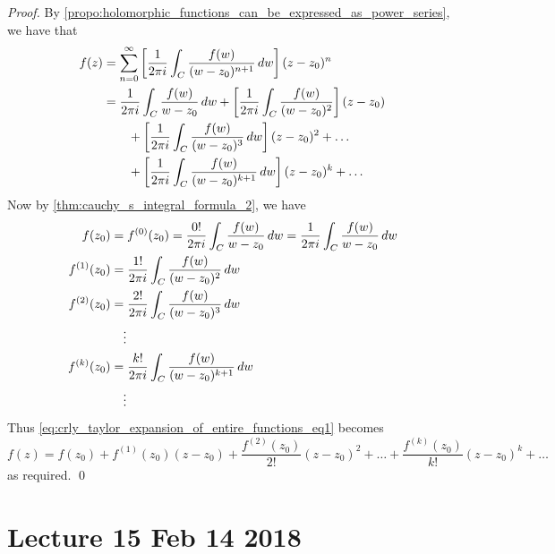\documentclass[11pt, oneside]{book}
\begin{document}
\begin{proof}
	By \cref{propo:holomorphic_functions_can_be_expressed_as_power_series}, we have that
	\begin{align}
		f(z) &= \sum_{n=0}^{\infty} \left[ \frac{1}{2 \pi i} \int_{C} \frac{f(w)}{(w - z_0)^{n + 1}} \mathop{}\!d{w} \right] (z - z_0)^n \nonumber \\
			&= \frac{1}{2 \pi i} \int_{C} \frac{f(w)}{w - z_0} \mathop{}\!d{w} + \left[ \frac{1}{2 \pi i} \int_{C} \frac{f(w)}{(w - z_0)^2} \right](z - z_0) \label{eq:crly_taylor_expansion_of_entire_functions_eq1} \\
			&\quad\quad + \left[ \frac{1}{2 \pi i} \int_{C} \frac{f(w)}{(w - z_0)^3} \mathop{}\!d{w} \right] (z - z_0)^2 + \hdots \nonumber \\
			&\quad\quad + \left[ \frac{1}{2 \pi i} \int_{C} \frac{f(w)}{(w - z_0)^{k + 1}} \mathop{}\!d{w} \right] (z - z_0)^k + \hdots \nonumber
	\end{align}
	Now by \cref{thm:cauchy_s_integral_formula_2}, we have
	\begin{align*}
		f(z_0) &= f^{(0)}(z_0) = \frac{0!}{2 \pi i} \int_{C} \frac{f(w)}{w - z_0} \mathop{}\!d{w} = \frac{1}{2 \pi i} \int_{C} \frac{f(w)}{w - z_0} \mathop{}\!d{w} \\
		f^{(1)}(z_0) &= \frac{1!}{2 \pi i} \int_{C} \frac{f(w)}{(w - z_0)^2} \mathop{}\!d{w} \\
		f^{(2)}(z_0) &= \frac{2!}{2 \pi i} \int_{C} \frac{f(w)}{(w - z_0)^3} \mathop{}\!d{w} \\
		&\quad\vdots \\
		f^{(k)}(z_0) &= \frac{k!}{2 \pi i} \int_{C} \frac{f(w)}{(w - z_0)^{k + 1}} \mathop{}\!d{w} \\
		&\quad\vdots
	\end{align*}
	Thus \cref{eq:crly_taylor_expansion_of_entire_functions_eq1} becomes
	\begin{equation*}
		f(z) = f(z_0) + f^{(1)}(z_0)(z - z_0) + \frac{f^{(2)}(z_0)}{2!} (z - z_0)^2 + \hdots + \frac{f^{(k)}(z_0)}{k!} (z - z_0)^k + \hdots
	\end{equation*}
	as required. \qed
\end{proof}



\chapter{Lecture 15 Feb 14 2018} %
\label{cha:lecture_15_feb_14_2018}
\end{document}
